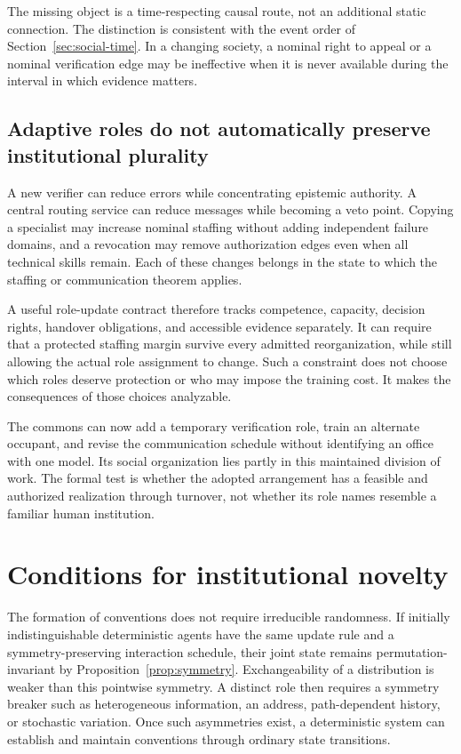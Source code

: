 \documentclass[11pt,letterpaper]{article}
\theoremstyle{plain}
\theoremstyle{definition}
\theoremstyle{remark}
\begin{document}
The missing object is a time-respecting causal route, not an additional static connection. The distinction is consistent with the event order of Section~\ref{sec:social-time}. In a changing society, a nominal right to appeal or a nominal verification edge may be ineffective when it is never available during the interval in which evidence matters.

\subsection{Adaptive roles do not automatically preserve institutional plurality}
A new verifier can reduce errors while concentrating epistemic authority. A central routing service can reduce messages while becoming a veto point. Copying a specialist may increase nominal staffing without adding independent failure domains, and a revocation may remove authorization edges even when all technical skills remain. Each of these changes belongs in the state to which the staffing or communication theorem applies.

A useful role-update contract therefore tracks competence, capacity, decision rights, handover obligations, and accessible evidence separately. It can require that a protected staffing margin survive every admitted reorganization, while still allowing the actual role assignment to change. Such a constraint does not choose which roles deserve protection or who may impose the training cost. It makes the consequences of those choices analyzable.

The commons can now add a temporary verification role, train an alternate occupant, and revise the communication schedule without identifying an office with one model. Its social organization lies partly in this maintained division of work. The formal test is whether the adopted arrangement has a feasible and authorized realization through turnover, not whether its role names resemble a familiar human institution.


\section{Conditions for institutional novelty}\label{sec:novelty}

The formation of conventions does not require irreducible randomness. If initially indistinguishable deterministic agents have the same update rule and a symmetry-preserving interaction schedule, their joint state remains permutation-invariant by Proposition~\ref{prop:symmetry}. Exchangeability of a distribution is weaker than this pointwise symmetry. A distinct role then requires a symmetry breaker such as heterogeneous information, an address, path-dependent history, or stochastic variation. Once such asymmetries exist, a deterministic system can establish and maintain conventions through ordinary state transitions.
\end{document}
